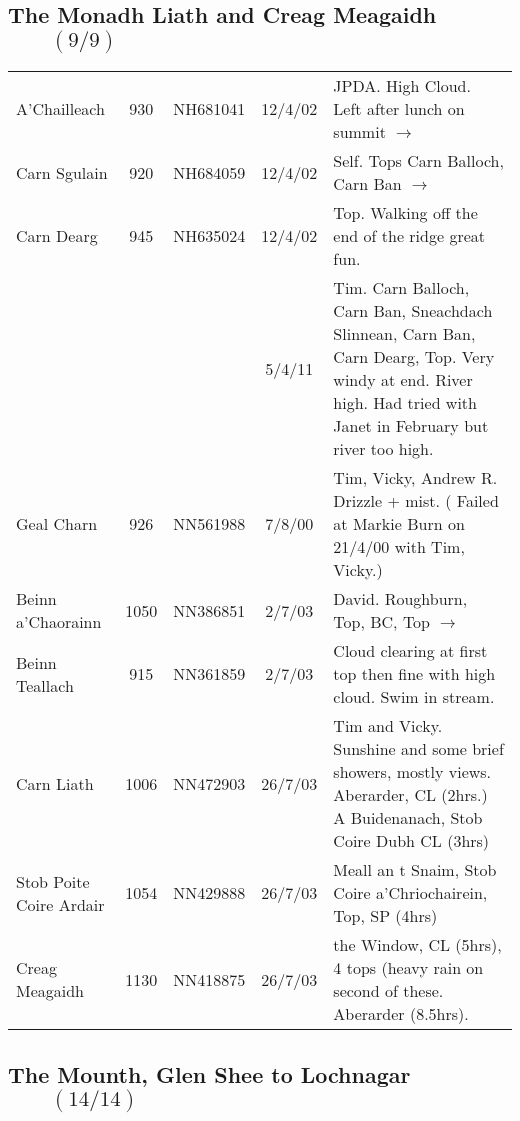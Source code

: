 \documentclass[10pt,a4paper]{article}
\begin{document}
\vspace{0.5in}

\subsection*{The Monadh Liath and Creag Meagaidh $\qquad (9/9)$}

\begin{tabular}{lcccp{6cm}}
A'Chailleach & 930 & NH681041 &12/4/02&JPDA. High Cloud. Left after lunch on summit
$\rightarrow$\\
Carn Sgulain & 920 & NH684059 &12/4/02& Self. Tops Carn Balloch, Carn Ban $\rightarrow$ \\
Carn Dearg & 945 & NH635024  &12/4/02& Top. Walking off the end of the ridge great fun.  \\
&&&5/4/11&Tim.    Carn Balloch, Carn Ban, Sneachdach Slinnean, Carn Ban, Carn Dearg, Top.
Very windy at end. River high. Had tried with Janet in February but river too high.\\
Geal Charn & 926  & NN561988 &7/8/00& Tim, Vicky, Andrew R.
Drizzle + mist.
( Failed at Markie Burn on 21/4/00 with Tim, Vicky.) \\
Beinn a'Chaorainn & 1050 & NN386851 &2/7/03&David.  Roughburn, Top, BC, Top $\rightarrow$ \\
Beinn Teallach & 915 & NN361859 &2/7/03&Cloud clearing at first
top then fine with high cloud. Swim in stream.\\
Carn Liath  & 1006 & NN472903 &26/7/03& Tim and Vicky. Sunshine and some brief
showers, mostly views. Aberarder, CL (2hrs.) A Buidenanach, Stob Coire Dubh CL (3hrs) \\
Stob Poite Coire Ardair  & 1054 & NN429888&26/7/03& Meall an t Snaim, Stob Coire a'Chriochairein,
Top, SP (4hrs) \\
Creag Meagaidh  & 1130 & NN418875 &26/7/03& the Window, CL (5hrs), 4 tops (heavy rain on
second of these. Aberarder (8.5hrs). \\
\end{tabular}

\newpage

\subsection*{The Mounth, Glen Shee to Lochnagar $\qquad (14/14)$}
\end{document}
